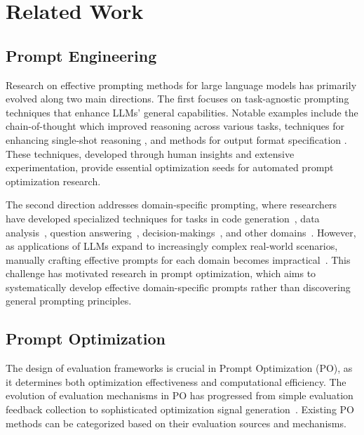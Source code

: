 \section{Related Work}

\subsection{Prompt Engineering}
Research on effective prompting methods for large language models has primarily evolved along two main directions. The first focuses on task-agnostic prompting techniques that enhance LLMs' general capabilities. Notable examples include the chain-of-thought \cite{wei2022COT, take2022zerocot} which improved reasoning across various tasks, techniques for enhancing single-shot reasoning \cite{deng2023rephrase, hua2024step, wang2024negativeprompt}, and methods for output format specification \cite{zhang2024aflow, he2024doseformat, zhi2024freeformat}. These techniques, developed through human insights and extensive experimentation, provide essential optimization seeds for automated prompt optimization research.

The second direction addresses domain-specific prompting, where researchers have developed specialized techniques for tasks in code generation~\cite{sirui2024meta, tal2024alpha,10720675}, data analysis~\cite{hong2024data, liu2024surveynl2sqllargelanguage,  DBLP:journals/pvldb/LiLCLT24}, question answering~\cite{DBLP:conf/emnlp/WuYSW0L24,DBLP:journals/corr/abs-2406-07815,yang2024askchartuniversalchartunderstanding}, decision-makings~\cite{zhang2024mobileexperts, guan2024voyager}, and other domains~\cite{guo2024largelanguagemodelbase,DBLP:journals/corr/abs-2404-18144,shen2024askhumansaiexploring}. However, as applications of LLMs expand to increasingly complex real-world scenarios, manually crafting effective prompts for each domain becomes impractical~\cite{zhang2024aflow}. This challenge has motivated research in prompt optimization, which aims to systematically develop effective domain-specific prompts rather than discovering general prompting principles.

\subsection{Prompt Optimization}

The design of evaluation frameworks is crucial in Prompt Optimization (PO), as it determines both optimization effectiveness and computational efficiency. The evolution of evaluation mechanisms in PO has progressed from simple evaluation feedback collection to sophisticated optimization signal generation~\cite{kai2024posurvey}.
Existing PO methods can be categorized based on their evaluation sources and mechanisms. 

